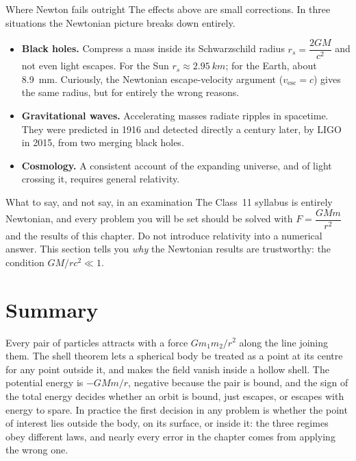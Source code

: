 \begin{remarkbox}{Where Newton fails outright}
The effects above are small corrections. In three situations the Newtonian picture breaks down
entirely.
\begin{itemize}
\item \textbf{Black holes.} Compress a mass inside its Schwarzschild radius
      $r_s=\dfrac{2GM}{c^{2}}$ and not even light escapes. For the Sun $r_s\approx\SI{2.95}{km}$; for
      the Earth, about \SI{8.9}{mm}. Curiously, the Newtonian escape-velocity argument
      ($v_{\text{esc}}=c$) gives the same radius, but for entirely the wrong reasons.
\item \textbf{Gravitational waves.} Accelerating masses radiate ripples in spacetime. They were predicted
      in 1916 and detected directly a century later, by LIGO in 2015, from two merging black holes.
\item \textbf{Cosmology.} A consistent account of the expanding universe, and of light crossing it,
      requires general relativity.
\end{itemize}
\end{remarkbox}

\begin{trapbox}{What to say, and not say, in an examination}
The Class~11 syllabus is entirely Newtonian, and every problem you will be set should be solved with
$F=\dfrac{GMm}{r^{2}}$ and the results of this chapter. Do not introduce relativity into a numerical
answer. This section tells you \emph{why} the Newtonian results are trustworthy: the condition
$GM/rc^{2}\ll1$.
\end{trapbox}

\section{Summary}\label{sec:summary16}
Every pair of particles attracts with a force $Gm_1m_2/r^2$ along the line joining them. The shell theorem
lets a spherical body be treated as a point at its centre for any point outside it, and makes the field
vanish inside a hollow shell. The potential energy is $-GMm/r$, negative because the pair is bound, and the
sign of the total energy decides whether an orbit is bound, just escapes, or escapes with energy to spare.
In practice the first decision in any problem is whether the point of interest lies outside the body, on its
surface, or inside it: the three regimes obey different laws, and nearly every error in the chapter comes
from applying the wrong one.

